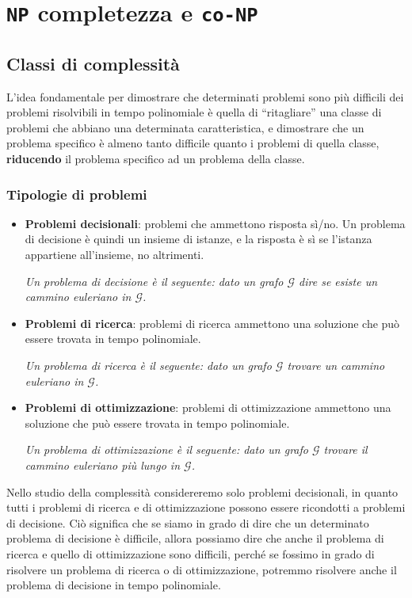 \chapter{\texttt{NP} completezza e \texttt{co-NP}}
\section{Classi di complessità}
L'idea fondamentale per dimostrare che determinati problemi sono più difficili dei problemi 
risolvibili in tempo polinomiale è quella di ``ritagliare'' una classe di problemi
che abbiano una determinata caratteristica, e dimostrare che un problema specifico
è almeno tanto difficile quanto i problemi di quella classe, \textbf{riducendo} il problema
specifico ad un problema della classe.
\subsection{Tipologie di problemi}
\begin{itemize}
    \item \textbf{Problemi decisionali}: problemi che ammettono risposta
    sì/no. Un problema di decisione è quindi un insieme di istanze, e la risposta
    è sì se l'istanza appartiene all'insieme, no altrimenti.

    \textit{Un problema di decisione è il seguente: dato un grafo $\mathcal{G}$ dire se 
    esiste un cammino euleriano in $\mathcal{G}$.}

    \item \textbf{Problemi di ricerca}: problemi di ricerca ammettono una soluzione
    che può essere trovata in tempo polinomiale.

    \textit{Un problema di ricerca è il seguente: dato un grafo $\mathcal{G}$
    trovare un cammino euleriano in $\mathcal{G}$.}
            
    \item \textbf{Problemi di ottimizzazione}: problemi di ottimizzazione
    ammettono una soluzione che può essere trovata in tempo polinomiale.

    \textit{Un problema di ottimizzazione è il seguente: dato un grafo $\mathcal{G}$
    trovare il cammino euleriano più lungo in $\mathcal{G}$.}
\end{itemize}
Nello studio della complessità considereremo solo problemi decisionali, in quanto
tutti i problemi di ricerca e di ottimizzazione possono essere ricondotti a problemi
di decisione. Ciò significa che se siamo in grado di dire che un determinato problema
di decisione è difficile, allora possiamo dire che anche il problema di ricerca e
quello di ottimizzazione sono difficili, perché se fossimo in grado di risolvere un 
problema di ricerca o di ottimizzazione, potremmo risolvere anche il problema di decisione
in tempo polinomiale.
